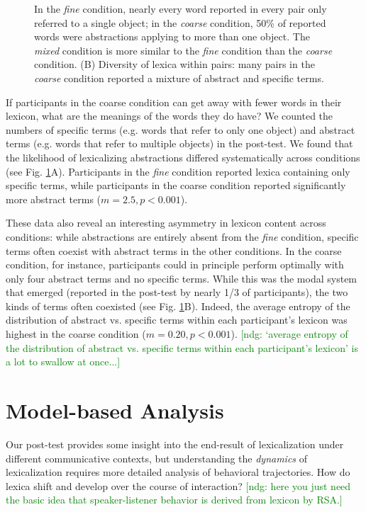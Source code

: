 \documentclass[10pt,letterpaper]{article}
\newcommand{\ndg}[1]{\textcolor{Green}{[ndg: #1]}}
\begin{document}
\begin{figure}[t]
\begin{center}
{{{In the \emph{fine} condition, nearly every word reported in every pair only referred to a single object; in the \emph{coarse} condition, 50\% of reported words were abstractions applying to more than one object. The \emph{mixed} condition is more similar to the \emph{fine} condition than the \emph{coarse} condition. (B) Diversity of lexica within pairs: many pairs in the \emph{coarse} condition reported a mixture of abstract and specific terms.%
\label{fig:lexiconContent}}}}
\end{center}
\end{figure}

If participants in the coarse condition can get away with fewer words in their lexicon, what are the meanings of the words they do have? We counted the numbers of specific terms (e.g. words that refer to only one object) and abstract terms (e.g. words that refer to multiple objects) in the post-test. We found that the likelihood of lexicalizing abstractions differed systematically across conditions (see Fig. \ref{fig:lexiconContent}A). Participants in the \emph{fine} condition reported lexica containing only specific terms, while participants in the coarse condition reported significantly more abstract terms ($m = 2.5, p < 0.001$). 

These data also reveal an interesting asymmetry in lexicon content across conditions: while abstractions are entirely absent from the \emph{fine} condition, specific terms often coexist with abstract terms in the other conditions. In the coarse condition, for instance, participants could in principle perform optimally with only four abstract terms and no specific terms. While this was the modal system that emerged (reported in the post-test by nearly 1/3 of participants), the two kinds of terms often coexisted (see Fig. \ref{fig:lexiconContent}B). Indeed, the average entropy of the distribution of abstract vs. specific terms within each participant's lexicon was highest in the coarse condition ($m = 0.20, p < 0.001$).
\ndg{`average entropy of the distribution of abstract vs. specific terms within each participant's lexicon' is a lot to swallow at once...}

\section{Model-based Analysis}

Our post-test provides some insight into the end-result of lexicalization under different communicative contexts, but understanding the \emph{dynamics} of lexicalization requires more detailed analysis of behavioral trajectories. How do lexica shift and develop over the course of interaction? 
\ndg{here you just need the basic idea that speaker-listener behavior is derived from lexicon by RSA.}
\end{document}
